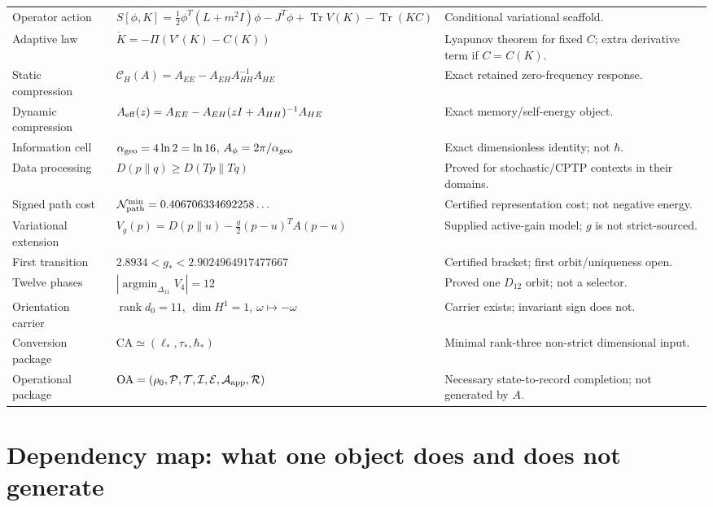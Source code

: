 \documentclass[11pt,a4paper]{article}
\theoremstyle{definition}
\theoremstyle{remark}
\newcommand{\Tr}{\operatorname{Tr}}
\begin{document}
\begin{longtable}{@{}p{}p{}p{}@{}}
Operator action & $S[\phi,K]=\frac12\phi^T(L+m^2I)\phi-J^T\phi+\Tr V(K)-\Tr(KC)$ & Conditional variational scaffold.\\[1mm]
Adaptive law & $\dot K=-\Pi(V'(K)-C(K))$ & Lyapunov theorem for fixed $C$; extra derivative term if $C=C(K)$.\\[1mm]
Static compression & $\mathcal C_H(A)=A_{EE}-A_{EH}A_{HH}^{-1}A_{HE}$ & Exact retained zero-frequency response.\\[1mm]
Dynamic compression & $A_{\rm eff}(z)=A_{EE}-A_{EH}(zI+A_{HH})^{-1}A_{HE}$ & Exact memory/self-energy object.\\[1mm]
Information cell & $\alpha_{\rm geo}=4\ln2=\ln16$, $A_\phi=2\pi/\alpha_{\rm geo}$ & Exact dimensionless identity; not $\hbar$.\\[1mm]
Data processing & $D(p\|q)\ge D(Tp\|Tq)$ & Proved for stochastic/CPTP contexts in their domains.\\[1mm]
Signed path cost & $\mathcal N_{\rm path}^{\min}=0.406706334692258\ldots$ & Certified representation cost; not negative energy.\\[1mm]
Variational extension & $V_g(p)=D(p\|u)-\frac g2(p-u)^TA(p-u)$ & Supplied active-gain model; $g$ is not strict-sourced.\\[1mm]
First transition & $2.8934<g_*<2.9024964917477667$ & Certified bracket; first orbit/uniqueness open.\\[1mm]
Twelve phases & $|\operatorname*{argmin}_{\Delta_{11}}V_4|=12$ & Proved one $D_{12}$ orbit; not a selector.\\[1mm]
Orientation carrier & $\operatorname{rank}d_0=11$, $\dim H^1=1$, $\omega\mapsto-\omega$ & Carrier exists; invariant sign does not.\\[1mm]
Conversion package & $\mathrm{CA}\simeq(\ell_*,\tau_*,\hbar_*)$ & Minimal rank-three non-strict dimensional input.\\[1mm]
Operational package & $\mathrm{OA}=(\rho_0,\mathcal P,\mathcal T,\mathcal I,\mathcal E,\mathcal A_{\rm app},\mathcal R)$ & Necessary state-to-record completion; not generated by $A$.\\
\bottomrule
\end{longtable}
\endgroup

\section{Dependency map: what one object does and does not generate}
\end{document}
